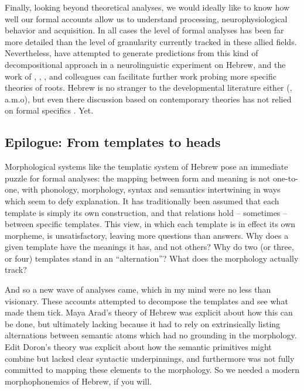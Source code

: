 Finally, looking beyond theoretical analyses, we would ideally like to know how well our formal accounts allow us to understand processing, neurophysiological behavior and acquisition. In all cases the level of formal analyses has been far more detailed than the level of granularity currently tracked in these allied fields. Nevertheless, \cite{kastneretal18} have attempted to generate predictions from this kind of decompositional approach in a neurolinguistic experiment on Hebrew, and the work of \cite{frostetal97}, \cite{fmdpmetal05jml}, \cite{deutschkuperman18}, and colleagues can facilitate further work probing more specific theories of roots. Hebrew is no stranger to the developmental literature either (\citealt{berman82,berman93jcl,ashkenazietal16,ravidetaltilar,havronarnon17jcl}, a.m.o), but even there discussion based on contemporary theories has not relied on formal specifics \citep{borer04,kastneradriaans17}. Yet.

	\subsection{Epilogue: From templates to heads}
Morphological systems like the templatic system of Hebrew pose an immediate puzzle for formal analyses: the mapping between form and meaning is not one-to-one, with phonology, morphology, syntax and semantics intertwining in ways which seem to defy explanation. It has traditionally been assumed that each template is simply its own construction, and that relations hold -- sometimes -- between specific templates. This view, in which each template is in effect its own morpheme, is unsatisfactory, leaving more questions than answers. Why does a given template have the meanings it has, and not others? Why do two (or three, or four) templates stand in an ``alternation''? What does the morphology actually track?

And so a new wave of analyses came, which in my mind were no less than visionary. These accounts attempted to decompose the templates and see what made them tick. Maya Arad's theory of Hebrew was explicit about how this can be done, but ultimately lacking because it had to rely on extrinsically listing alternations between semantic atoms which had no grounding in the morphology. Edit Doron's theory was explicit about how the semantic primitives might combine but lacked clear syntactic underpinnings, and furthermore was not fully committed to mapping these elements to the morphology. So we needed a modern morphophonemics of Hebrew, if you will.

